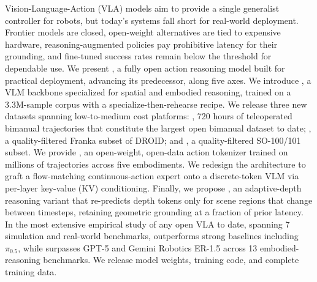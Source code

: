 Vision-Language-Action (VLA) models aim to provide a single generalist controller for robots, but today's systems fall short for real-world deployment. Frontier models are closed, open-weight alternatives are tied to expensive hardware, reasoning-augmented policies pay prohibitive latency for their grounding, and fine-tuned success rates remain below the threshold for dependable use. We present \molmoactt, a fully open action reasoning model built for practical deployment, advancing its predecessor, \molmoact along five axes. We introduce \molmoer, a VLM backbone specialized for spatial and embodied reasoning, trained on a 3.3M-sample corpus with a specialize-then-rehearse recipe. We release three new datasets spanning low-to-medium cost platforms: \molmoacttyamdata, 720 hours of teleoperated bimanual trajectories that constitute the largest open bimanual dataset to date; \molmoacttdroiddata, a quality-filtered Franka subset of DROID; and \molmoacttsodata, a quality-filtered SO-100/101 subset. We provide \molmoactfast, an open-weight, open-data action tokenizer trained on millions of trajectories across five embodiments. We redesign the architecture to graft a flow-matching continuous-action expert onto a discrete-token VLM via per-layer key-value (KV) conditioning. Finally, we propose \molmothink, an adaptive-depth reasoning variant that re-predicts depth tokens only for scene regions that change between timesteps, retaining geometric grounding at a fraction of prior latency. In the most extensive empirical study of any open VLA to date, spanning 7 simulation and real-world benchmarks, \molmoactt outperforms strong baselines including $\pi_{0.5}$, while \molmoer surpasses GPT-5 and Gemini Robotics ER-1.5 across 13 embodied-reasoning benchmarks. We release model weights, training code, and complete training data.
